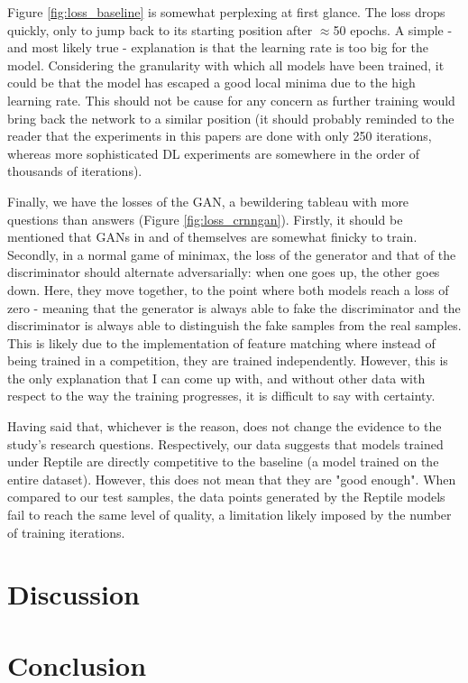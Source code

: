 \documentclass[a4paper]{book}
\begin{document}
Figure \ref{fig:loss_baseline} is somewhat perplexing at first glance. The loss drops quickly, only to jump back to its starting position after $\approx$50 epochs. A simple - and most likely true - explanation is that the learning rate is too big for the model. Considering the granularity with which all models have been trained, it could be that the model has escaped a good local minima due to the high learning rate. This should not be cause for any concern as further training would bring back the network to a similar position (it should probably reminded to the reader that the experiments in this papers are done with only 250 iterations, whereas more sophisticated DL experiments are somewhere in the order of thousands of iterations). 

Finally, we have the losses of the GAN, a bewildering tableau with more questions than answers (Figure \ref{fig:loss_crnngan}). Firstly, it should be mentioned that GANs in and of themselves are somewhat finicky to train. Secondly, in a normal game of minimax, the loss of the generator and that of the discriminator should alternate adversarially: when one goes up, the other goes down. Here, they move together, to the point where both models reach a loss of zero - meaning that the generator is always able to fake the discriminator and the discriminator is always able to distinguish the fake samples from the real samples. This is likely due to the implementation of feature matching where instead of being trained in a competition, they are trained independently. However, this is the only explanation that I can come up with, and without other data with respect to the way the training progresses, it is difficult to say with certainty.

Having said that, whichever is the reason, does not change the evidence to the study's research questions. Respectively, our data suggests that models trained under Reptile are directly competitive to the baseline (a model trained on the entire dataset). However, this does not mean that they are "good enough". When compared to our test samples, the data points generated by the Reptile models fail to reach the same level of quality, a limitation likely imposed by the number of training iterations.

\chapter{Discussion}\label{chap:discussion}

\chapter{Conclusion}\label{chap:conclusion}
\end{document}
